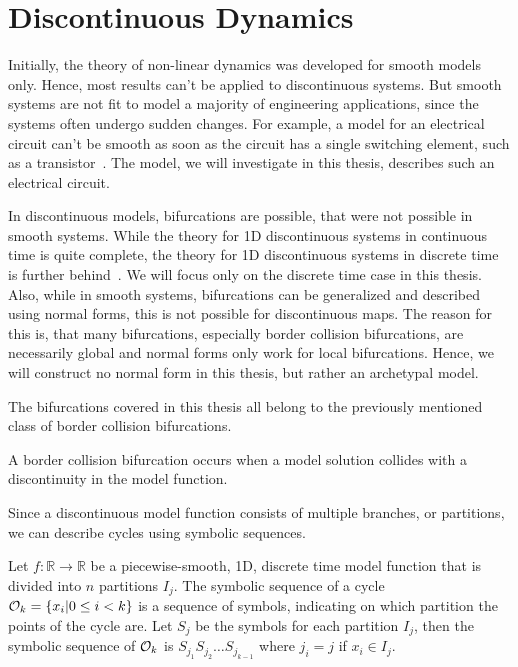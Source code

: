 \section{Discontinuous Dynamics}
\label{sec:state.discont}

Initially, the theory of non-linear dynamics was developed for smooth models only.
Hence, most results can't be applied to discontinuous systems.
But smooth systems are not fit to model a majority of engineering applications, since the systems often undergo sudden changes.
For example, a model for an electrical circuit can't be smooth as soon as the circuit has a single switching element, such as a transistor~\cite{ZhuMos03}.
The model, we will investigate in this thesis, describes such an electrical circuit.

In discontinuous models, bifurcations are possible, that were not possible in smooth systems.
While the theory for 1D discontinuous systems in continuous time is quite complete, the theory for 1D discontinuous systems in discrete time is further behind~\cite{Simpson16}.
We will focus only on the discrete time case in this thesis.
Also, while in smooth systems, bifurcations can be generalized and described using normal forms, this is not possible for discontinuous maps.
The reason for this is, that many bifurcations, especially border collision bifurcations, are necessarily global and normal forms only work for local bifurcations.
Hence, we will construct no normal form in this thesis, but rather an archetypal model.

The bifurcations covered in this thesis all belong to the previously mentioned class of border collision bifurcations.

\begin{definition}
	A border collision bifurcation occurs when a model solution collides with a discontinuity in the model function.
\end{definition}

Since a discontinuous model function consists of multiple branches, or partitions, we can describe cycles using symbolic sequences.

\begin{definition}
	Let $f: \mathbb{R} \to \mathbb{R}$ be a piecewise-smooth, 1D, discrete time model function that is divided into $n$ partitions $I_j$.
	The symbolic sequence of a cycle $\mathcal{O}_k = \{x_i | 0 \leq i < k\}$ is a sequence of symbols, indicating on which partition the points of the cycle are.
	Let $S_j$ be the symbols for each partition $I_j$, then the symbolic sequence of $\mathcal{O}_k$ is $S_{j_1} S_{j_2} \dots S_{j_{k-1}}$ where $j_i = j$ if $x_i \in I_j$.
\end{definition}

